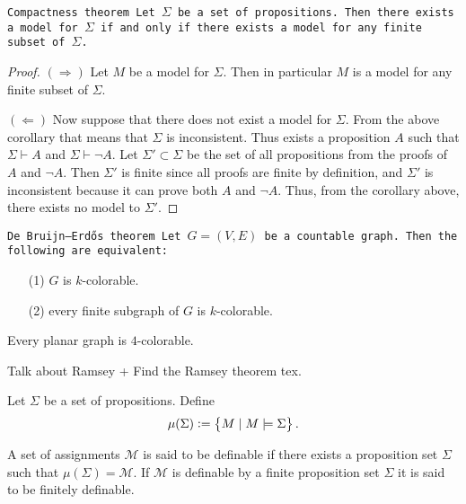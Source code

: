 \documentclass[11pt,a4paper]{article}
\begin{document}
  \begin{theorem}\tt{Compactness theorem}
    Let $\Sigma$ be a set of propositions.
    Then there exists a model for $\Sigma$ if and only if
    there exists a model for any finite subset of $\Sigma$.
  \end{theorem}
  \begin{proof}
    $(\Rightarrow)$ Let $M$ be a model for $\Sigma$.
    Then in particular $M$ is a model for any finite subset of $\Sigma$.

    $(\Leftarrow)$ Now suppose that there does not exist a model for $\Sigma$.
    From the above corollary that means that $\Sigma$ is inconsistent.
    Thus exists a proposition $A$ such that
    $\Sigma \vdash A$ and $\Sigma \vdash \neg A$.
    Let $\Sigma' \subset \Sigma$ be the set of all propositions from
    the proofs of $A$ and $\neg A$.
    Then $\Sigma'$ is finite since all proofs are finite by definition,
    and $\Sigma'$ is inconsistent because it can prove both $A$ and $\neg A$.
    Thus, from the corollary above, there exists no model to $\Sigma'$.
  \end{proof}

  \begin{theorem}\tt{De Bruijn–Erdős theorem}
    Let $G = (V, E)$ be a countable graph.
    Then the following are equivalent:
    \begin{enumerate}
      \item[(1)] $G$ is $k$-colorable.
      \item[(2)] every finite subgraph of $G$ is $k$-colorable.
    \end{enumerate}
  \end{theorem}

  \begin{corollary}
    Every planar graph is $4$-colorable.
  \end{corollary}

  Talk about Ramsey + Find the Ramsey theorem tex.

  \begin{definition}
    Let $\Sigma$ be a set of propositions. Define
    \[
      \mu(\Sigma) := \set{M \mid M \models \Sigma}.
    \]
  \end{definition}

  \begin{definition}[Definability]
    A set of assignments $\mathcal M$ is said to be definable if there
    exists a proposition set $\Sigma$ such that $\mu(\Sigma) = \mathcal M$.
    If $\mathcal M$ is definable by a finite proposition set $\Sigma$ it is
    said to be finitely definable.
  \end{definition}
\end{document}
